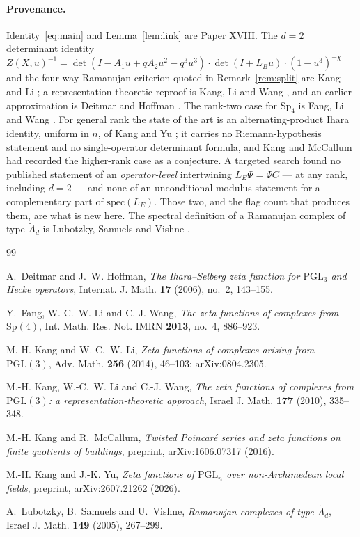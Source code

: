 \documentclass[11pt]{amsart}
\theoremstyle{plain}
\theoremstyle{definition}
\theoremstyle{remark}
\newcommand{\LE}{L_E}
\newcommand{\Atilde}[1]{\widetilde A_{#1}}
\begin{document}
\paragraph{Provenance.} Identity~\eqref{eq:main} and Lemma~\ref{lem:link} are Paper XVIII.
The $d=2$ determinant identity
$Z(X,u)^{-1}=\det(I-A_1u+qA_2u^{2}-q^{3}u^{3})\cdot\det(I+L_Bu)\cdot(1-u^{3})^{-\chi}$
and the four-way Ramanujan criterion quoted in Remark~\ref{rem:split} are Kang and Li
\cite{KL14}; a representation-theoretic reproof is Kang, Li and Wang \cite{KLW10}, and an
earlier approximation is Deitmar and Hoffman \cite{DH06}. The rank-two case for
$\mathrm{Sp}_4$ is Fang, Li and Wang \cite{FLW13}. For general rank the state of the art is
an alternating-product Ihara identity, uniform in $n$, of Kang and Yu \cite{KY26}; it carries
no Riemann-hypothesis statement and no single-operator determinant formula, and Kang and
McCallum \cite{KM16} had recorded the higher-rank case as a conjecture. A targeted search
found no published statement of an \emph{operator-level} intertwining
$\LE\Psi=\Psi C$ --- at any rank, including $d=2$ --- and none of an unconditional modulus
statement for a complementary part of $\mathrm{spec}(\LE)$. Those two, and the flag count
that produces them, are what is new here. The spectral definition of a Ramanujan complex of
type $\Atilde d$ is Lubotzky, Samuels and Vishne \cite{LSV05}.

\begin{thebibliography}{99}

 A.~Deitmar and J.~W. Hoffman,
\emph{The Ihara--Selberg zeta function for $\mathrm{PGL}_3$ and Hecke operators},
Internat. J. Math. \textbf{17} (2006), no.~2, 143--155.

 Y.~Fang, W.-C.~W. Li and C.-J. Wang,
\emph{The zeta functions of complexes from $\mathrm{Sp}(4)$},
Int. Math. Res. Not. IMRN \textbf{2013}, no.~4, 886--923.

 M.-H. Kang and W.-C.~W. Li,
\emph{Zeta functions of complexes arising from $\mathrm{PGL}(3)$},
Adv. Math. \textbf{256} (2014), 46--103; arXiv:0804.2305.

 M.-H. Kang, W.-C.~W. Li and C.-J. Wang,
\emph{The zeta functions of complexes from $\mathrm{PGL}(3)$: a representation-theoretic
approach}, Israel J. Math. \textbf{177} (2010), 335--348.

 M.-H. Kang and R.~McCallum,
\emph{Twisted Poincar\'e series and zeta functions on finite quotients of buildings},
preprint, arXiv:1606.07317 (2016).

 M.-H. Kang and J.-K. Yu,
\emph{Zeta functions of $\mathrm{PGL}_n$ over non-Archimedean local fields},
preprint, arXiv:2607.21262 (2026).

 A.~Lubotzky, B.~Samuels and U.~Vishne,
\emph{Ramanujan complexes of type $\widetilde A_d$},
Israel J. Math. \textbf{149} (2005), 267--299.

\end{thebibliography}
\end{document}
